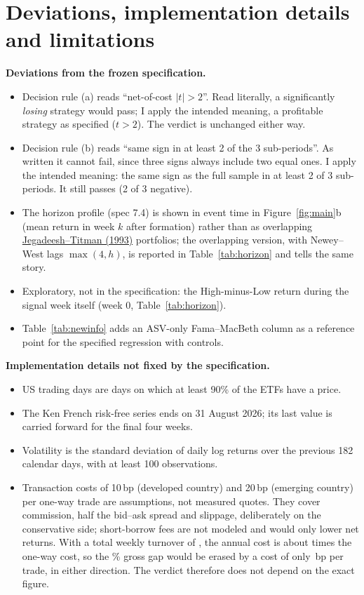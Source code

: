 \documentclass[11pt,a4paper]{article}
\DeclareRobustCommand{\refto}[2]{\hyperlink{ref:#1}{#2}}
\begin{document}
\section{Deviations, implementation details and limitations}\label{app:deviations}
\textbf{Deviations from the frozen specification.}
\begin{itemize}[leftmargin=*]
  \item Decision rule (a) reads ``net-of-cost $|t|>2$''. Read literally, a significantly
        \emph{losing} strategy would pass; I apply the intended meaning, a profitable strategy as
        specified ($t>2$). The verdict is unchanged either way.
  \item Decision rule (b) reads ``same sign in at least 2 of the 3 sub-periods''. As written it cannot
        fail, since three signs always include two equal ones. I apply the intended meaning: the same
        sign as the full sample in at least 2 of 3 sub-periods. It still passes (2 of 3 negative).
  \item The horizon profile (spec 7.4) is shown in event time in Figure~\ref{fig:main}b (mean return
        in week $k$ after formation) rather than as overlapping
        \refto{jegadeesh1993}{Jegadeesh--Titman (1993)} portfolios; the overlapping version, with
        Newey--West lags $\max(4,h)$, is reported in Table~\ref{tab:horizon} and tells the same story.
  \item Exploratory, not in the specification: the High-minus-Low return during the signal week
        itself (week 0, Table~\ref{tab:horizon}).
  \item Table~\ref{tab:newinfo} adds an ASV-only Fama--MacBeth column as a reference point for the
        specified regression with controls.
\end{itemize}
\textbf{Implementation details not fixed by the specification.}
\begin{itemize}[leftmargin=*]
  \item US trading days are days on which at least 90\% of the ETFs have a price.
  \item The Ken French risk-free series ends on 31 August 2026; its last value is carried forward
        for the final four weeks.
  \item Volatility is the standard deviation of daily log returns over the previous 182 calendar
        days, with at least 100 observations.
  \item Transaction costs of 10\,bp (developed country) and 20\,bp (emerging country) per one-way trade are
        assumptions, not measured quotes. They cover commission, half the bid--ask spread and
        slippage, deliberately on the conservative side; short-borrow fees are not modeled and
        would only lower net returns. With a total weekly turnover of \TurnoverTotal{}, the annual
        cost is about \CostMultiplier{} times the one-way cost, so the \LSLoss\% gross gap would be
        erased by a cost of only \BreakEvenBps\,bp per trade, in either direction. The verdict
        therefore does not depend on the exact figure.
\end{itemize}
\end{document}
